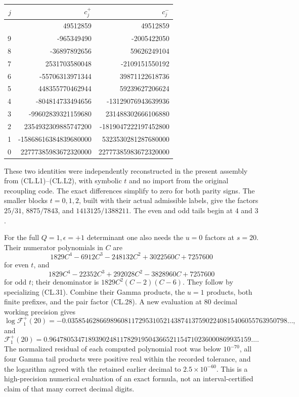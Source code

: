 \documentclass[a4paper,11pt]{article}
\numberwithin{equation}{section}
\begin{document}
\begin{longtable}[]{@{}rrr@{}}
\toprule\noalign{}
\(j\) & \(c_j^+\) & \(c_j^-\) \\
\midrule\noalign{}
\endhead
\bottomrule\noalign{}
\endlastfoot
10 & 49512859 & 49512859 \\
9 & -965349490 & -2005422050 \\
8 & -36897892656 & 59626249104 \\
7 & 2531703580048 & -2109151550192 \\
6 & -55706313971344 & 39871122618736 \\
5 & 448355770462944 & 59239627206624 \\
4 & -804814733494656 & -13129076943639936 \\
3 & -99602839321159680 & 231488302666106880 \\
2 & 2354932309885747200 & -1819047222197452800 \\
1 & -15868616384839680000 & 5323530281287680000 \\
0 & 22777385983672320000 & 22777385983672320000 \\
\end{longtable}

These two identities were independently reconstructed in the present assembly from (CL.L1)--(CL.L2), with symbolic \(t\) and no import from the original recoupling code. The exact differences simplify to zero for both parity signs. The smaller blocks \(t=0,1,2\), built with their actual admissible labels, give the factors \(25/31\), \(8875/7843\), and \(1413125/1388211\). The even and odd tails begin at \(4\) and \(3\).

For the full \(Q=1,\epsilon=+1\) determinant one also needs the \(u=0\) factors at \(s=20\). Their numerator polynomials in \(C\) are \[
1829C^4-6912C^3-248132C^2+3022560C+7257600
\] for even \(t\), and \[
1829C^4-22352C^3+292028C^2-3828960C+7257600
\] for odd \(t\); their denominator is \(1829C^2(C-2)(C-6)\). They follow by specializing (CL.31). Combine their Gamma products, the \(u=1\) products, both finite prefixes, and the pair factor (CL.28). A new evaluation at 80 decimal working precision gives \[
\log\mathcal F_1^+(20)=
-0.03585462866989608117295310521438741375902240815406055763950798\ldots,
\tag{CL.L9}
\] and \[
\mathcal F_1^+(20)=
0.964780534718939024811782919504366521154710236000869935159\ldots.
\] The normalized residual of each computed polynomial root was below \(10^{-70}\), all four Gamma tail products were positive real within the recorded tolerance, and the logarithm agreed with the retained earlier decimal to \(2.5\times10^{-60}\). This is a high-precision numerical evaluation of an exact formula, not an interval-certified claim of that many correct decimal digits.
\end{document}

